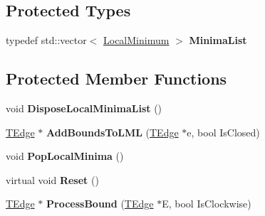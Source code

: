 \subsection*{Protected Types}
\begin{DoxyCompactItemize}
\item 
\hypertarget{class_clipper_lib_1_1_clipper_base_addb22572066d3983dcd5797c542df00b}{}\label{class_clipper_lib_1_1_clipper_base_addb22572066d3983dcd5797c542df00b} 
typedef std\+::vector$<$ \hyperlink{struct_clipper_lib_1_1_local_minimum}{Local\+Minimum} $>$ {\bfseries Minima\+List}
\end{DoxyCompactItemize}
\subsection*{Protected Member Functions}
\begin{DoxyCompactItemize}
\item 
\hypertarget{class_clipper_lib_1_1_clipper_base_a311dbbec1454ab7965e363a0359f5ee4}{}\label{class_clipper_lib_1_1_clipper_base_a311dbbec1454ab7965e363a0359f5ee4} 
void {\bfseries Dispose\+Local\+Minima\+List} ()
\item 
\hypertarget{class_clipper_lib_1_1_clipper_base_a906ea17c9dc8822d689e54c3243e7f58}{}\label{class_clipper_lib_1_1_clipper_base_a906ea17c9dc8822d689e54c3243e7f58} 
\hyperlink{struct_clipper_lib_1_1_t_edge}{T\+Edge} $\ast$ {\bfseries Add\+Bounds\+To\+L\+ML} (\hyperlink{struct_clipper_lib_1_1_t_edge}{T\+Edge} $\ast$e, bool Is\+Closed)
\item 
\hypertarget{class_clipper_lib_1_1_clipper_base_a9554e9f2273c39e0f5f07d3cd73533e6}{}\label{class_clipper_lib_1_1_clipper_base_a9554e9f2273c39e0f5f07d3cd73533e6} 
void {\bfseries Pop\+Local\+Minima} ()
\item 
\hypertarget{class_clipper_lib_1_1_clipper_base_a125febb065f23fc55dafffe8d185b642}{}\label{class_clipper_lib_1_1_clipper_base_a125febb065f23fc55dafffe8d185b642} 
virtual void {\bfseries Reset} ()
\item 
\hypertarget{class_clipper_lib_1_1_clipper_base_a292655c74a7e70a8b8829337c632bdf0}{}\label{class_clipper_lib_1_1_clipper_base_a292655c74a7e70a8b8829337c632bdf0} 
\hyperlink{struct_clipper_lib_1_1_t_edge}{T\+Edge} $\ast$ {\bfseries Process\+Bound} (\hyperlink{struct_clipper_lib_1_1_t_edge}{T\+Edge} $\ast$E, bool Is\+Clockwise)
\item 
\hypertarget{class_clipper_lib_1_1_clipper_base_ae57efb542cfbbc42d000815e8a2e2877}{}\label{class_clipper_lib_1_1_clipper_base_ae57efb542cfbbc42d000815e8a2e2877} 

\end{DoxyCompactItemize}
